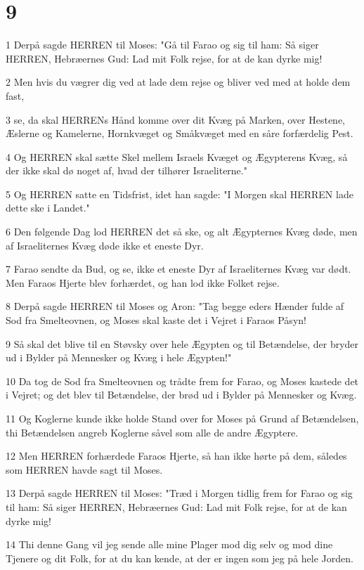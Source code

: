 \chapter{9}

\par 1 Derpå sagde HERREN til Moses: "Gå til Farao og sig til ham: Så siger HERREN, Hebræernes Gud: Lad mit Folk rejse, for at de kan dyrke mig!
\par 2 Men hvis du vægrer dig ved at lade dem rejse og bliver ved med at holde dem fast,
\par 3 se, da skal HERRENs Hånd komme over dit Kvæg på Marken, over Hestene, Æslerne og Kamelerne, Hornkvæget og Småkvæget med en såre forfærdelig Pest.
\par 4 Og HERREN skal sætte Skel mellem Israels Kvæget og Ægypterens Kvæg, så der ikke skal dø noget af, hvad der tilhører Israeliterne."
\par 5 Og HERREN satte en Tidsfrist, idet han sagde: "I Morgen skal HERREN lade dette ske i Landet."
\par 6 Den følgende Dag lod HERREN det så ske, og alt Ægypternes Kvæg døde, men af Israeliternes Kvæg døde ikke et eneste Dyr.
\par 7 Farao sendte da Bud, og se, ikke et eneste Dyr af Israeliternes Kvæg var dødt. Men Faraos Hjerte blev forhærdet, og han lod ikke Folket rejse.
\par 8 Derpå sagde HERREN til Moses og Aron: "Tag begge eders Hænder fulde af Sod fra Smelteovnen, og Moses skal kaste det i Vejret i Faraos Påsyn!
\par 9 Så skal det blive til en Støvsky over hele Ægypten og til Betændelse, der bryder ud i Bylder på Mennesker og Kvæg i hele Ægypten!"
\par 10 Da tog de Sod fra Smelteovnen og trådte frem for Farao, og Moses kastede det i Vejret; og det blev til Betændelse, der brød ud i Bylder på Mennesker og Kvæg.
\par 11 Og Koglerne kunde ikke holde Stand over for Moses på Grund af Betændelsen, thi Betændelsen angreb Koglerne såvel som alle de andre Ægyptere.
\par 12 Men HERREN forhærdede Faraos Hjerte, så han ikke hørte på dem, således som HERREN havde sagt til Moses.
\par 13 Derpå sagde HERREN til Moses: "Træd i Morgen tidlig frem for Farao og sig til ham: Så siger HERREN, Hebræernes Gud: Lad mit Folk rejse, for at de kan dyrke mig!
\par 14 Thi denne Gang vil jeg sende alle mine Plager mod dig selv og mod dine Tjenere og dit Folk, for at du kan kende, at der er ingen som jeg på hele Jorden.
